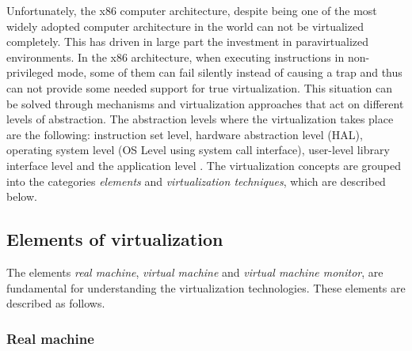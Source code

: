 

	
	
	
	
	Unfortunately, the x86 computer architecture, despite being one of the most widely adopted computer architecture in the world can not be virtualized completely\cite{Adams}. This has driven in large part the investment in paravirtualized environments.  In the x86 architecture, when executing instructions in non-privileged mode, some of them can fail silently instead of causing a trap and thus can not provide some needed support for true virtualization.  
	This situation can be solved through mechanisms and  virtualization approaches that act on different levels of abstraction. The abstraction levels where the virtualization takes place are the following: instruction set level, hardware abstraction level (HAL), operating system level (OS Level using system call interface), user-level library interface level and the application level \cite{Chiueh2005}. The virtualization concepts are grouped into the categories \textit{elements} and \textit{virtualization techniques}, which are described below.
	
	\subsection{Elements of virtualization}
	
	The elements \textit {real machine}, \textit {virtual machine} and \textit {virtual machine monitor}, are fundamental for understanding the virtualization technologies.
	These elements are described as follows.
	
	\subsubsection{Real machine}
	
